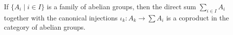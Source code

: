 \begin{theorem}
If $\{A_i \mid i \in I\}$ is a family of abelian groups, then the direct sum $\sum_{i \in I} A_i$ together with the canonical injections $\iota_k : A_k \rightarrow \sum A_i$ is a coproduct in the category of abelian groups.
\end{theorem}
